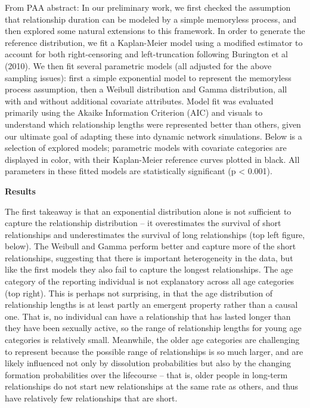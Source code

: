 \documentclass [11pt, proquest] {uwthesis}[2015/03/03]
\begin{document}
From PAA abstract: In our preliminary work, we first checked the
assumption that relationship duration can be modeled by a simple
memoryless process, and then explored some natural extensions to this
framework. In order to generate the reference distribution, we fit a
Kaplan-Meier model using a modified estimator to account for both
right-censoring and left-truncation following Burington et al (2010). We
then fit several parametric models (all adjusted for the above sampling
issues): first a simple exponential model to represent the memoryless
process assumption, then a Weibull distribution and Gamma distribution,
all with and without additional covariate attributes. Model fit was
evaluated primarily using the Akaike Information Criterion (AIC) and
visuals to understand which relationship lengths were represented better
than others, given our ultimate goal of adapting these into dynamic
network simulations. Below is a selection of explored models; parametric
models with covariate categories are displayed in color, with their
Kaplan-Meier reference curves plotted in black. All parameters in these
fitted models are statistically significant (p \textless{} 0.001).

\textbf{Results}

The first takeaway is that an exponential distribution alone is not
sufficient to capture the relationship distribution -- it overestimates
the survival of short relationships and underestimates the survival of
long relationships (top left figure, below). The Weibull and Gamma
perform better and capture more of the short relationships, suggesting
that there is important heterogeneity in the data, but like the first
models they also fail to capture the longest relationships. The age
category of the reporting individual is not explanatory across all age
categories (top right). This is perhaps not surprising, in that the age
distribution of relationship lengths is at least partly an emergent
property rather than a causal one. That is, no individual can have a
relationship that has lasted longer than they have been sexually active,
so the range of relationship lengths for young age categories is
relatively small. Meanwhile, the older age categories are challenging to
represent because the possible range of relationships is so much larger,
and are likely influenced not only by dissolution probabilities but also
by the changing formation probabilities over the lifecourse -- that is,
older people in long-term relationships do not start new relationships
at the same rate as others, and thus have relatively few relationships
that are short.
\end{document}
